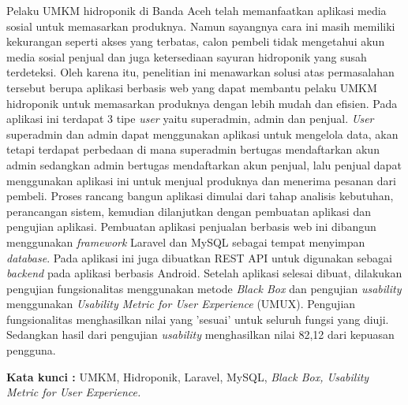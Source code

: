 \begin{abstractind}

Pelaku UMKM hidroponik di Banda Aceh telah memanfaatkan aplikasi media sosial untuk memasarkan produknya. Namun sayangnya cara ini masih memiliki kekurangan seperti akses yang terbatas, calon pembeli tidak mengetahui akun media sosial penjual dan juga ketersediaan sayuran hidroponik yang susah terdeteksi. Oleh karena itu, penelitian ini menawarkan solusi atas permasalahan tersebut berupa aplikasi berbasis web yang dapat membantu pelaku UMKM hidroponik untuk memasarkan produknya dengan lebih mudah dan efisien. Pada aplikasi ini terdapat 3 tipe \textit{user} yaitu superadmin, admin dan penjual. \textit{User} superadmin dan admin dapat menggunakan aplikasi untuk mengelola data, akan tetapi terdapat perbedaan di mana superadmin bertugas mendaftarkan akun admin sedangkan admin bertugas mendaftarkan akun penjual, lalu penjual dapat menggunakan aplikasi ini untuk menjual produknya dan menerima pesanan dari pembeli. Proses rancang bangun aplikasi dimulai dari tahap analisis kebutuhan, perancangan sistem, kemudian dilanjutkan dengan pembuatan aplikasi dan pengujian aplikasi. Pembuatan aplikasi penjualan berbasis web ini dibangun menggunakan \textit{framework} Laravel dan MySQL sebagai tempat menyimpan \textit{database}. Pada aplikasi ini juga dibuatkan REST API untuk digunakan sebagai \textit{backend} pada aplikasi berbasis Android. Setelah aplikasi selesai dibuat, dilakukan pengujian fungsionalitas menggunakan metode \textit{Black Box} dan pengujian \textit{usability} menggunakan \textit{Usability Metric for User Experience} (UMUX). Pengujian fungsionalitas menghasilkan nilai yang ’sesuai’ untuk seluruh fungsi yang diuji. Sedangkan hasil dari pengujian \textit{usability} menghasilkan nilai 82,12 dari kepuasan pengguna.



\bigskip
\noindent
\textbf{Kata kunci :} UMKM, Hidroponik, Laravel, MySQL, \textit{Black Box, Usability Metric for User Experience.}
\end{abstractind}